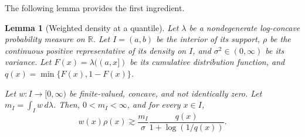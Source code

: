 \documentclass[11pt]{article}
\newtheorem{lemma}[theorem]{Lemma}
\theoremstyle{definition}
\theoremstyle{remark}
\newcommand{\R}{\mathbb R}
\begin{document}
The following lemma provides the first ingredient.
\begin{lemma}[Weighted density at a quantile]
\label{lem:weighted-density-quantile}
Let $\lambda$ be a nondegenerate log-concave probability measure on $\R$. Let $I=(a,b)$ be the interior of its support, $\rho$ be the continuous positive representative of its density on $I$, and  $\sigma^2\in(0,\infty)$ be its variance. Let $F(x)=\lambda((a,x])$ be its cumulative distribution function, and $q(x)=\min\{F(x),1-F(x)\}$.

Let $w:I\to[0,\infty)$ be finite-valued, concave, and not identically zero. Let $m_I=\int_I w\,d\lambda$.  
Then, $0<m_I<\infty$, and for every $x\in I$,
\begin{equation}\label{eq:pointwise-needle-boundary}
 w(x)\rho(x)
 \gtrsim
 \frac{{m_I}}{\sigma}
 \frac{q(x)}{1+\log(1/q(x))}.
\end{equation}
\end{lemma}
\end{document}
